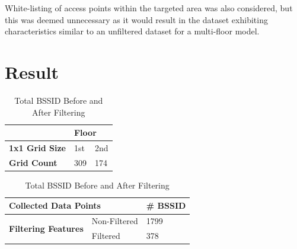 \documentclass[runningheads]{llncs}
\begin{document}
White-listing of access points within the targeted area was also considered, but this was deemed unnecessary as it would result in the dataset exhibiting characteristics similar to an unfiltered dataset for a multi-floor model.


\section{Result}
\begin{table}[htbp]
	\centering
	\begin{minipage}{0.38\textwidth}
		\centering
		\caption{Total True Unique Grids by Floor (1x1 Grid Size)
		\label{tab:true_unique_grid}}
		\vspace{-10pt}
		\begin{tabular}{|l|l|l|} 
			\hline
			& \multicolumn{2}{l|}{\textbf{Floor}}  \\ 
			\hline
			\textbf{1x1 Grid Size} & 1st & 2nd                            \\ 
			\hline
			\textbf{Grid Count}    & 309 & 174                            \\
			\hline
		\end{tabular}
	\end{minipage}
	\hspace{10pt}
	\begin{minipage}{0.48\textwidth}
		\centering
		\caption{Total BSSID Before and After Filtering}
		\label{tab:bssid_counts}
		\centering
		\begin{tabular}{|l|l|l|}
			\hline
			\multicolumn{2}{|l|}{\textbf{Collected Data Points}} & \textbf{\# BSSID} \\
			\hline
			\multirow{2}{*}{\textbf{Filtering Features}} & Non-Filtered & 1799 \\
			\cline{2-3}
			& Filtered & 378 \\
			\hline
		\end{tabular}
	\end{minipage}
\end{table}

\end{document}
